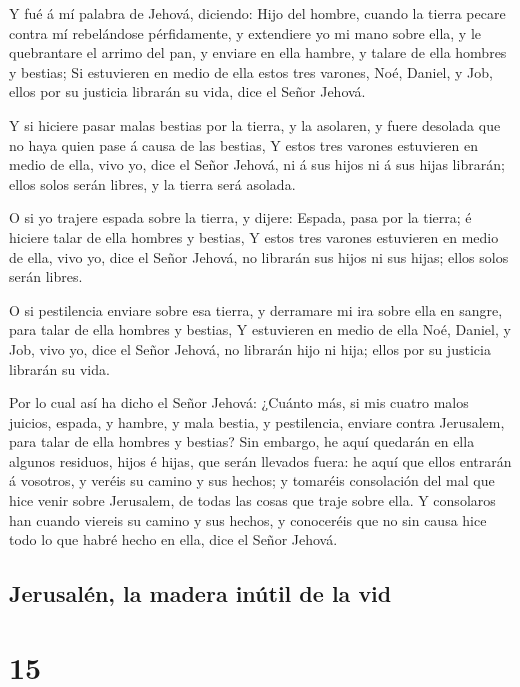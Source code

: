  Y fué á mí palabra de Jehová, diciendo: 
Hijo del hombre, cuando la tierra pecare contra mí rebelándose
pérfidamente, y extendiere yo mi mano sobre ella, y le quebrantare el
arrimo del pan, y enviare en ella hambre, y talare de ella hombres y
bestias;  Si estuvieren en medio de ella estos tres
varones, Noé, Daniel, y Job, ellos por su justicia librarán su vida,
dice el Señor Jehová.

 Y si hiciere pasar malas bestias por la tierra, y la
asolaren, y fuere desolada que no haya quien pase á causa de las
bestias,  Y estos tres varones estuvieren en medio de
ella, vivo yo, dice el Señor Jehová, ni á sus hijos ni á sus hijas
librarán; ellos solos serán libres, y la tierra será asolada.

 O si yo trajere espada sobre la tierra, y dijere:
Espada, pasa por la tierra; é hiciere talar de ella hombres y bestias,
 Y estos tres varones estuvieren en medio de ella, vivo
yo, dice el Señor Jehová, no librarán sus hijos ni sus hijas; ellos
solos serán libres.

 O si pestilencia enviare sobre esa tierra, y derramare
mi ira sobre ella en sangre, para talar de ella hombres y bestias,
 Y estuvieren en medio de ella Noé, Daniel, y Job, vivo
yo, dice el Señor Jehová, no librarán hijo ni hija; ellos por su
justicia librarán su vida.

 Por lo cual así ha dicho el Señor Jehová: ¿Cuánto más,
si mis cuatro malos juicios, espada, y hambre, y mala bestia, y
pestilencia, enviare contra Jerusalem, para talar de ella hombres y
bestias?  Sin embargo, he aquí quedarán en ella algunos
residuos, hijos é hijas, que serán llevados fuera: he aquí que ellos
entrarán á vosotros, y veréis su camino y sus hechos; y tomaréis
consolación del mal que hice venir sobre Jerusalem, de todas las cosas
que traje sobre ella.  Y consolaros han cuando viereis su
camino y sus hechos, y conoceréis que no sin causa hice todo lo que
habré hecho en ella, dice el Señor Jehová.

\hypertarget{jerusaluxe9n-la-madera-inuxfatil-de-la-vid}{%
\subsection{Jerusalén, la madera inútil de la
vid}\label{jerusaluxe9n-la-madera-inuxfatil-de-la-vid}}

\hypertarget{section-26-15}{%
\section{15}\label{section-26-15}}

